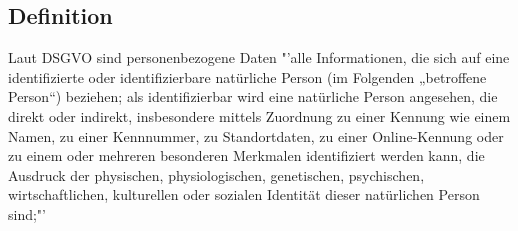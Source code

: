 	\subsection{Definition}
	Laut DSGVO sind personenbezogene Daten "'alle Informationen, die sich auf eine identifizierte oder identifizierbare natürliche Person (im Folgenden „betroffene Person“) beziehen; als identifizierbar wird eine natürliche Person angesehen, die direkt oder indirekt, insbesondere mittels Zuordnung zu einer Kennung wie einem Namen, zu einer Kennnummer, zu Standortdaten, zu einer Online-Kennung oder zu einem oder mehreren besonderen Merkmalen identifiziert werden kann, die Ausdruck der physischen, physiologischen, genetischen, psychischen, wirtschaftlichen, kulturellen oder sozialen Identität dieser natürlichen Person sind;"'\cite{personenbezogeneDaten}

